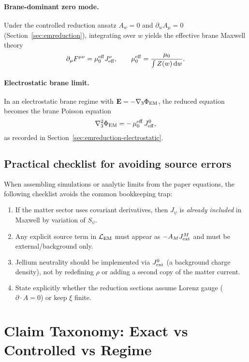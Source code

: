 \documentclass[11pt]{article}
\begin{document}
\paragraph{Brane-dominant zero mode.}
Under the controlled reduction ansatz $A_w=0$ and $\partial_w A_\mu=0$ (Section~\ref{sec:emreduction}), integrating over $w$ yields the effective brane Maxwell theory
\begin{equation}
\partial_\mu F^{\mu\nu}=\mu_0^{\rm eff}J_{\rm eff}^\nu,
\qquad
\mu_0^{\rm eff}=\frac{\mu_0}{\int Z(w)\,\dd w}.
\end{equation}

\paragraph{Electrostatic brane limit.}
In an electrostatic brane regime with $\mathbf{E}=-\nabla_3\Phi_{\rm EM}$, the reduced equation becomes the brane Poisson equation
\begin{equation}
\nabla_3^2\Phi_{\rm EM} = -\,\mu_0^{\rm eff}\,J_{\rm eff}^0,
\end{equation}
as recorded in Section~\ref{sec:emreduction-electrostatic}.

\subsection{Practical checklist for avoiding source errors}
\label{app:gauge-checklist}

When assembling simulations or analytic limits from the paper equations, the following checklist avoids the common bookkeeping trap:
\begin{enumerate}[leftmargin=2.2em]
\item If the matter sector uses covariant derivatives, then $J_\psi$ is \emph{already included} in Maxwell by variation of $S_\psi$.
\item Any explicit source term in $\mathcal L_{\rm EM}$ must appear as $-A_M J_{\rm ext}^M$ and must be external/background only.
\item Jellium neutrality should be implemented via $J_{\rm ext}^0$ (a background charge density), not by redefining $\rho$ or adding a second copy of the matter current.
\item State explicitly whether the reduction sections assume Lorenz gauge ($\partial\!\cdot\!A=0$) or keep $\xi$ finite.
\end{enumerate}

\section{Claim Taxonomy: Exact vs Controlled vs Regime}
\label{app:claims}
\end{document}
